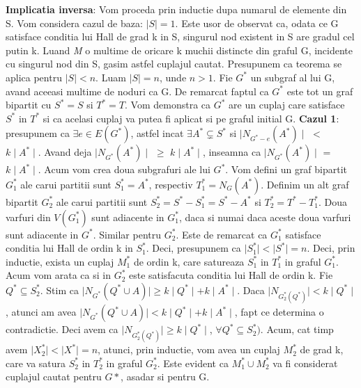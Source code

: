 \documentclass{article}
\begin{document}
\newline
\newline
\textbf{Implicatia inversa}:
Vom proceda prin inductie dupa numarul de elemente din S.
Vom considera cazul de baza: $\mid S \mid = 1$.
Este usor de observat ca, odata ce G satisface conditia lui Hall de grad k in S, singurul nod existent in S are gradul cel putin k. Luand \textit{M} o multime de oricare k muchii distincte din graful G, incidente cu singurul nod din S, gasim astfel cuplajul cautat.
\newline
\newline
Presupunem ca teorema se aplica pentru  $\mid S \mid < n$. Luam $\mid S \mid = n$, unde $n>1$. Fie $G^*$ un subgraf al lui G, avand aceeasi multime de noduri ca G. De remarcat faptul ca $G^*$ este tot un graf bipartit cu $S^*=S$ si $T^*=T$. Vom demonstra ca $G^*$ are un cuplaj care satisface $S^*$ in $T^*$ si ca acelasi cuplaj va putea fi aplicat si pe graful initial G.
\newline
\newline
\textbf{Cazul 1}: presupunem ca $\exists e \in E(G^*)$, astfel incat $\exists A^* \subsetneq S^*$ si $\mid N_{G^*-e}(A^*)\mid$ $<$ $k \mid A^*\mid$. Avand deja $\mid N_{G^*}(A^*)\mid$ $\geq$ $k \mid A^*\mid$, inseamna ca $\mid N_{G^*}(A^*)\mid$ = $k \mid A^*\mid$. Acum vom crea doua subgrafuri ale lui $G^*$. Vom defini un graf bipartit $G_1^*$ ale carui partitii sunt $S_1^*=A^*$, respectiv $T_1^*=N_G(A^*)$. Definim un alt graf bipartit $G_2^*$ ale carui partitii sunt $S_2^*=S^*-S_1^*=S^*-A^*$ si $T_2^*=T^*-T_1^*$. Doua varfuri din $V(G_1^*)$ sunt adiacente in $G_1^*$, daca si numai daca aceste doua varfuri sunt adiacente in $G^*$. Similar pentru $G_2^*$. Este de remarcat ca $G_1^*$ satisface conditia lui Hall de ordin k in $S_1^*$. Deci, presupunem ca $\mid S_1^* \mid < \mid S^* \mid = n$. Deci, prin inductie, exista un cuplaj $M_1^*$ de ordin k, care satureaza $S_1^*$ in $T_1^*$ in graful $G_1^*$. Acum vom arata ca si in $G_2^*$ este satisfacuta conditia lui Hall de ordin k. Fie $Q^* \subseteq S_2^*$.  Stim ca $\mid N_{G^*}(Q^* \cup A)\mid \geq k \mid Q^* \mid + k \mid A^* \mid $.
Daca $\mid N_{G_2^*(Q^*)}\mid < k \mid Q^* \mid $, atunci am avea $\mid N_{G^*}(Q^* \cup A)\mid < k \mid Q^* \mid + k \mid A^* \mid $, fapt ce determina o contradictie. Deci avem ca $\mid N_{G_2^*(Q^*)}\mid \geq k \mid Q^* \mid $, $\forall Q^*\subseteq S_2^*)$. Acum, cat timp avem $\mid X_2^*\mid < \mid X^*\mid = n$, atunci, prin inductie, vom avea un cuplaj $M_2^*$ de grad k, care va satura $S_2^*$ in $T_2^*$ in graful $G_2^*$. Este evident ca $M_1^* \cup M_2^*$ va fi considerat cuplajul cautat pentru $G*$, asadar si pentru G.
\end{document}
